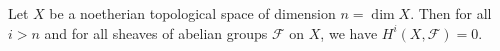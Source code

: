 Let $X$ be a noetherian topological space of dimension $n = \dim X$. Then for all $i > n$ and for all sheaves of abelian groups $\mathcal{F}$ on $X$, we have $H^i(X, \mathcal{F}) = 0$.
